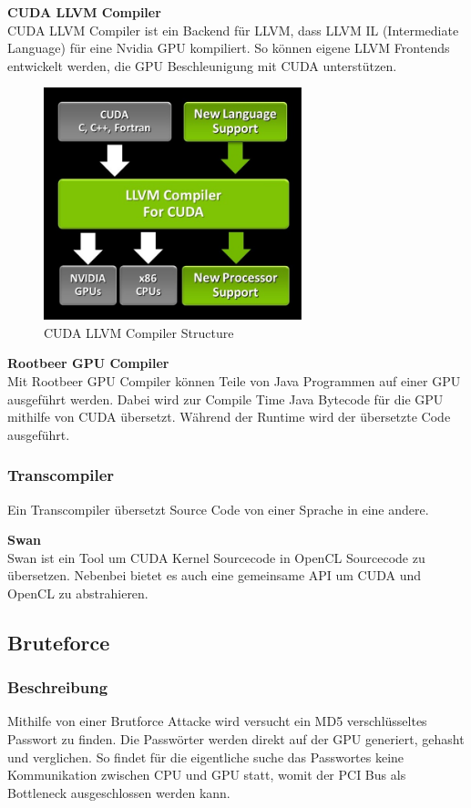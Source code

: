 \newpage

\textbf{CUDA LLVM Compiler}\\
CUDA LLVM Compiler ist ein Backend für LLVM, dass LLVM IL (Intermediate Language) für eine Nvidia GPU kompiliert. So können eigene LLVM Frontends entwickelt werden, die GPU Beschleunigung mit CUDA unterstützen.

\begin{figure}[!h]
	\begin{center}
		\includegraphics[width=7.5cm]{images/LLVM_Compiler_structure.jpg}
		\caption{CUDA LLVM Compiler Structure\cite{cudallvm}}
	\end{center}
\end{figure}

\textbf{Rootbeer GPU Compiler}\\
Mit Rootbeer GPU Compiler können Teile von Java Programmen auf einer GPU ausgeführt werden. Dabei wird zur Compile Time Java Bytecode für die GPU mithilfe von CUDA übersetzt. Während der Runtime wird der übersetzte Code ausgeführt.\cite{rootbeer1}

\subsubsection{Transcompiler}
Ein Transcompiler übersetzt Source Code von einer Sprache in eine andere.

\textbf{Swan}\\
Swan ist ein Tool um CUDA Kernel Sourcecode in OpenCL Sourcecode zu übersetzen. Nebenbei bietet es auch eine gemeinsame API um CUDA und OpenCL zu abstrahieren.\cite{swan}



\newpage
\subsection{Bruteforce}
\subsubsection{Beschreibung}
Mithilfe von einer Brutforce Attacke wird versucht ein MD5 verschlüsseltes Passwort zu finden. Die Passwörter werden direkt auf der GPU generiert, gehasht und verglichen. So findet für die eigentliche suche das Passwortes keine Kommunikation zwischen CPU und GPU statt, womit der PCI Bus als Bottleneck ausgeschlossen werden kann.
